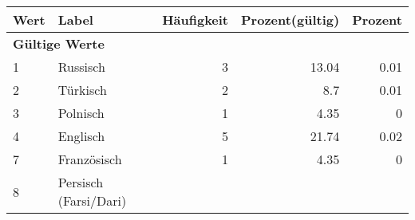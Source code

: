      \begin{longtable}{lXrrr}
     \toprule
     \textbf{Wert} & \textbf{Label} & \textbf{Häufigkeit} & \textbf{Prozent(gültig)} & \textbf{Prozent} \\
     \endhead
     \midrule
     \multicolumn{5}{l}{\textbf{Gültige Werte}}\\

     1 &
     \multicolumn{1}{X}{ Russisch   } &


       \num{3} &
       \num[round-mode=places,round-precision=2]{13.04} &
         \num[round-mode=places,round-precision=2]{0.01} \\

     2 &
     \multicolumn{1}{X}{ Türkisch   } &


       \num{2} &
       \num[round-mode=places,round-precision=2]{8.7} &
         \num[round-mode=places,round-precision=2]{0.01} \\

     3 &
     \multicolumn{1}{X}{ Polnisch   } &


       \num{1} &
       \num[round-mode=places,round-precision=2]{4.35} &
         \num[round-mode=places,round-precision=2]{0} \\

     4 &
     \multicolumn{1}{X}{ Englisch   } &


       \num{5} &
       \num[round-mode=places,round-precision=2]{21.74} &
         \num[round-mode=places,round-precision=2]{0.02} \\

     7 &
     \multicolumn{1}{X}{ Französisch   } &


       \num{1} &
       \num[round-mode=places,round-precision=2]{4.35} &
         \num[round-mode=places,round-precision=2]{0} \\

     8 &
     \multicolumn{1}{X}{ Persisch (Farsi/Dari)   } &



\end{longtable}
